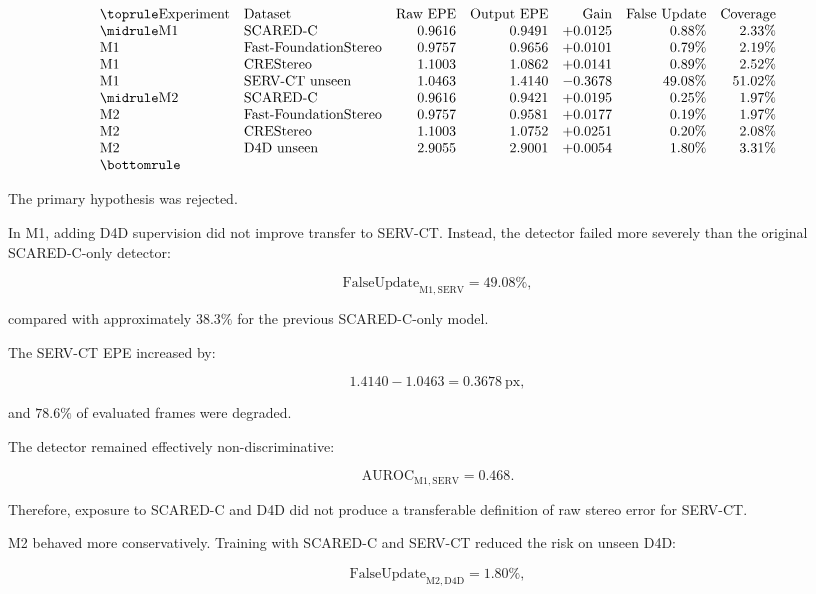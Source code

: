 \documentclass[11pt,a4paper]{article}
\begin{document}
\[
\begin{array}{llrrrrr}
\toprule
\text{Experiment}
&
\text{Dataset}
&
\text{Raw EPE}
&
\text{Output EPE}
&
\text{Gain}
&
\text{False Update}
&
\text{Coverage}
\\
\midrule
\mathrm{M1}
&
\text{SCARED-C}
&
0.9616
&
0.9491
&
+0.0125
&
0.88\%
&
2.33\%
\\
\mathrm{M1}
&
\text{Fast-FoundationStereo}
&
0.9757
&
0.9656
&
+0.0101
&
0.79\%
&
2.19\%
\\
\mathrm{M1}
&
\text{CREStereo}
&
1.1003
&
1.0862
&
+0.0141
&
0.89\%
&
2.52\%
\\
\mathrm{M1}
&
\text{SERV-CT unseen}
&
1.0463
&
1.4140
&
-0.3678
&
49.08\%
&
51.02\%
\\
\midrule
\mathrm{M2}
&
\text{SCARED-C}
&
0.9616
&
0.9421
&
+0.0195
&
0.25\%
&
1.97\%
\\
\mathrm{M2}
&
\text{Fast-FoundationStereo}
&
0.9757
&
0.9581
&
+0.0177
&
0.19\%
&
1.97\%
\\
\mathrm{M2}
&
\text{CREStereo}
&
1.1003
&
1.0752
&
+0.0251
&
0.20\%
&
2.08\%
\\
\mathrm{M2}
&
\text{D4D unseen}
&
2.9055
&
2.9001
&
+0.0054
&
1.80\%
&
3.31\%
\\
\bottomrule
\end{array}
\]

The primary hypothesis was rejected.

In M1, adding D4D supervision did not improve transfer to SERV-CT. Instead, the detector failed more severely than the original SCARED-C-only detector:

\[
\mathrm{FalseUpdate}_{\mathrm{M1, SERV}}
=
49.08\%,
\]

compared with approximately \(38.3\%\) for the previous SCARED-C-only model.

The SERV-CT EPE increased by:

\[
1.4140 - 1.0463 = 0.3678\ \text{px},
\]

and \(78.6\%\) of evaluated frames were degraded.

The detector remained effectively non-discriminative:

\[
\mathrm{AUROC}_{\mathrm{M1, SERV}}=0.468.
\]

Therefore, exposure to SCARED-C and D4D did not produce a transferable definition of raw stereo error for SERV-CT.

M2 behaved more conservatively. Training with SCARED-C and SERV-CT reduced the risk on unseen D4D:

\[
\mathrm{FalseUpdate}_{\mathrm{M2, D4D}}=1.80\%,
\]
\end{document}
